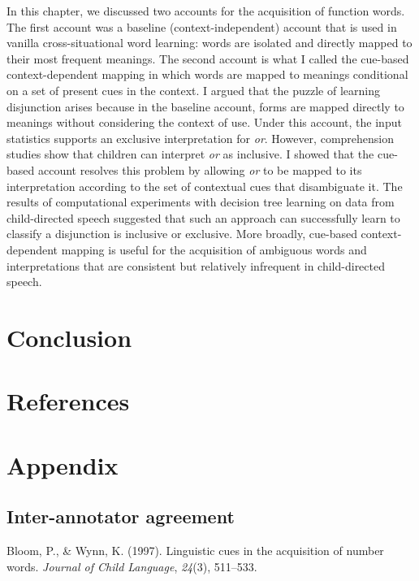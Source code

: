 \documentclass[floatsintext,man]{apa6}
\theoremstyle{definition}
\theoremstyle{definition}
\theoremstyle{definition}
\theoremstyle{remark}
\begin{document}
In this chapter, we discussed two accounts for the acquisition of
function words. The first account was a baseline (context-independent)
account that is used in vanilla cross-situational word learning: words
are isolated and directly mapped to their most frequent meanings. The
second account is what I called the cue-based context-dependent mapping
in which words are mapped to meanings conditional on a set of present
cues in the context. I argued that the puzzle of learning disjunction
arises because in the baseline account, forms are mapped directly to
meanings without considering the context of use. Under this account, the
input statistics supports an exclusive interpretation for \emph{or}.
However, comprehension studies show that children can interpret
\emph{or} as inclusive. I showed that the cue-based account resolves
this problem by allowing \emph{or} to be mapped to its interpretation
according to the set of contextual cues that disambiguate it. The
results of computational experiments with decision tree learning on data
from child-directed speech suggested that such an approach can
successfully learn to classify a disjunction is inclusive or exclusive.
More broadly, cue-based context-dependent mapping is useful for the
acquisition of ambiguous words and interpretations that are consistent
but relatively infrequent in child-directed speech.

\section{Conclusion}\label{conclusion}

\newpage

\section{References}\label{references}

\section{Appendix}\label{appendix}

\subsection{Inter-annotator agreement}\label{inter-annotator-agreement}

\setlength{\parindent}{-0.5in} \setlength{\leftskip}{0.5in}

\hypertarget{refs}{}
\hypertarget{ref-bloom1997linguistic}{}
Bloom, P., \& Wynn, K. (1997). Linguistic cues in the acquisition of
number words. \emph{Journal of Child Language}, \emph{24}(3), 511--533.
\end{document}
